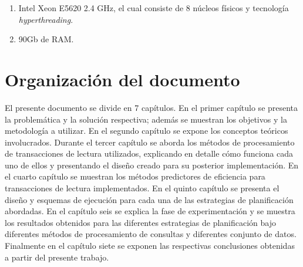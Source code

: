 \begin{enumerate}
  \item Intel Xeon E5620 2.4 GHz, el cual consiste de 8 núcleos físicos y tecnología \textit{hyperthreading}. 
  \item 90Gb de RAM.
\end{enumerate}

\section{Organización del documento}
\label{intro:organizaciondocumento}
El presente documento se divide en 7 capítulos. En el primer capítulo se presenta la problemática y la solución respectiva; además se muestran los objetivos y la metodología a utilizar. En el segundo capítulo se expone los conceptos teóricos involucrados. Durante el tercer capítulo se aborda los métodos de procesamiento de transacciones de lectura utilizados, explicando en detalle cómo funciona cada uno de ellos y presentando el diseño creado para su posterior implementación. En el cuarto capítulo se muestran los métodos predictores de eficiencia para transacciones de lectura implementados. En el quinto capítulo se presenta el diseño y esquemas de ejecución para cada una de las estrategias de planificación abordadas. En el capítulo seis se explica la fase de experimentación y se muestra los resultados obtenidos para las diferentes estrategias de planificación bajo diferentes métodos de procesamiento de consultas y diferentes conjunto de datos. Finalmente en el capítulo siete se exponen las respectivas conclusiones obtenidas a partir del presente trabajo.